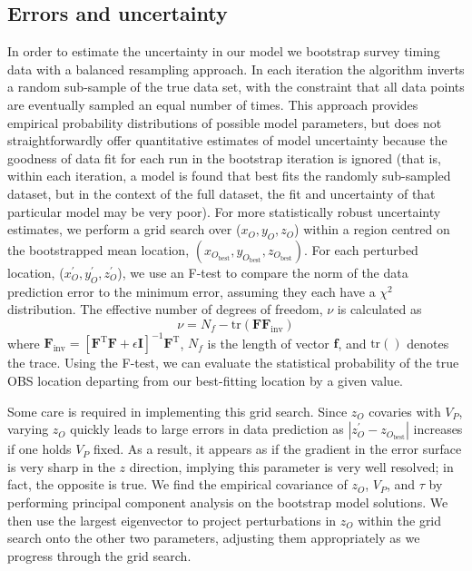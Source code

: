 \subsection{Errors and uncertainty}
In order to estimate the uncertainty in our model we bootstrap survey timing data with a balanced resampling approach. In each iteration the algorithm inverts a random sub-sample of the true data set, with the constraint that all data points are eventually sampled an equal number of times. This approach provides empirical probability distributions of possible model parameters, but does not straightforwardly offer quantitative estimates of model uncertainty because the goodness of data fit for each run in the bootstrap iteration is ignored (that is, within each iteration, a model is found that best fits the randomly sub-sampled dataset, but in the context of the full dataset, the fit and uncertainty of that particular model may be very poor). For more statistically robust uncertainty estimates, we perform a grid search over ($x_O,y_O,z_O$) within a region centred on the bootstrapped mean location, 
$(x_{O_{\text{best}}},y_{O_{\text{best}}},z_{O_{\text{best}}})$. For each perturbed location, ($x_O^{\prime},y_O^{\prime},z_O^{\prime}$), we use an F-test to compare the norm of the data prediction error to the minimum error, assuming they each have a $\chi^2$ distribution. The effective number of degrees of freedom, $\nu$ is calculated as 
\begin{equation}
\nu = N_f - \text{tr}(\mathbf{F}\mathbf{F}_{\text{inv}})
\end{equation}
where $\mathbf{F}_{\text{inv}}= \left[ \mathbf{F}^{\text{T}} \mathbf{F} + \epsilon\mathbf{I} \right]^{-1} \mathbf{F}^{\text{T}}$, $N_f$ is the length of vector $\mathbf{f}$, and $\text{tr}()$ denotes the trace. Using the F-test, we can evaluate the statistical probability of the true OBS location departing from our best-fitting location by a given value. 

Some care is required in implementing this grid search. Since $z_O$ covaries with $V_P$, varying $z_O$ quickly leads to large errors in data prediction as $|z_O^{\prime}-z_{O_{\text{best}}}|$ increases if one holds $V_P$ fixed. As a result, it appears as if the gradient in the error surface is very sharp in the $z$ direction, implying this parameter is very well resolved; in fact, the opposite is true. We find the empirical covariance of $z_O$, $V_P$, and $\tau$ by performing principal component analysis on the bootstrap model solutions. We then use the largest eigenvector to project perturbations in $z_O$ within the grid search onto the other two parameters, adjusting them appropriately as we progress through the grid search. 







